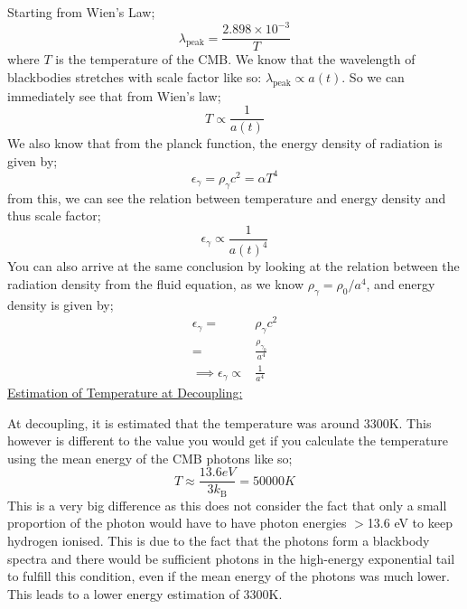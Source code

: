 \documentclass[11pt, a4paper, answers]{exam}
\begin{document}
\begin{questions}
\begin{solution}
        Starting from Wien's Law;
        \begin{equation*}
            \lambda_{\text{peak}} = \frac{2.898\times10^{-3}}{T}
        \end{equation*}
        where $T$ is the temperature of the CMB. We know that the wavelength of blackbodies
        stretches with scale factor like so: $\lambda_{\text{peak}}\propto a(t)$. So we can
        immediately see that from Wien's law;
        \begin{equation*}
            T \propto \frac{1}{a(t)}
        \end{equation*}
        We also know that from the planck function, the energy density of radiation is given by;
        \begin{equation*}
            \epsilon_{\gamma} = \rho_{\gamma}c^2 = \alpha T^4
        \end{equation*}
        from this, we can see the relation between temperature and energy density and thus scale
        factor;
        \begin{equation*}
            \epsilon_{\gamma} \propto \frac{1}{a(t)^4}
        \end{equation*}
        You can also arrive at the same conclusion by looking at the relation between the radiation
        density from the fluid equation, as we know $\rho_{\gamma} = \rho_0/a^4$, and energy density
        is given by;
        \begin{align*}
            \epsilon_{\gamma} =                  & \rho_{\gamma}c^2              \\
            =                                    & \frac{\rho_{\gamma_{0}}}{a^4} \\
            \implies  \epsilon_{\gamma}  \propto & \frac{1}{a^4}
        \end{align*}
        \underline{Estimation of Temperature at Decoupling:}

        At decoupling, it is estimated that the temperature was around 3300K. This however is
        different to the value you would get if you calculate the temperature using the mean energy
        of the CMB photons like so;
        \begin{equation*}
            T \approx \frac{13.6 eV}{3k_{\text{B}}} = 50000 K
        \end{equation*}
        This is a very big difference as this does not consider the fact that only a small
        proportion of the photon would have to have photon energies $>$13.6 eV to keep hydrogen
        ionised. This is due to the fact that the photons form a blackbody spectra and there would
        be sufficient photons in the high-energy exponential tail to fulfill this
        condition, even if the mean energy of the photons was much lower. This leads to a lower
        energy estimation of 3300K.


\end{solution}
\end{questions}
\end{document}
